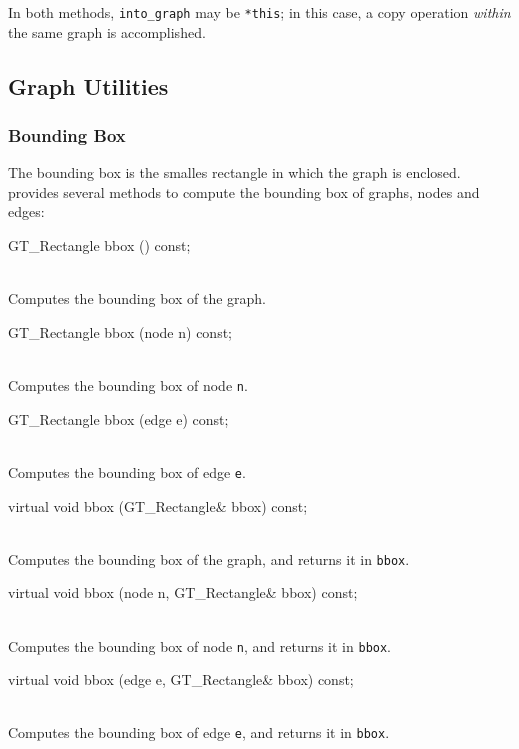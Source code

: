 \documentclass[twoside,fleqn]{report}
\begin{document}
\noindent In both methods, \texttt{into\_graph} may be \texttt{*this};
in this case, a copy operation \emph{within} the same graph is
accomplished.


%
%

\subsection{Graph Utilities}

\subsubsection{Bounding Box}

The bounding box is the smalles rectangle in which the graph is
enclosed.  provides several methods to compute the
bounding box of graphs, nodes and edges:

\begin{Cdefinition}

  \item[GT\_Rectangle bbox () const;] \strut\\
  Computes the bounding box of the graph.

  \item[GT\_Rectangle bbox (node n) const;]\ \strut\\
  Computes the bounding box of node \texttt{n}.

  \item[GT\_Rectangle bbox (edge e) const;] \strut\\
  Computes the bounding box of edge \texttt{e}.

  \item[virtual void bbox (GT\_Rectangle\& bbox) const;] \strut\\
  Computes the bounding box of the graph, and returns it in \texttt{bbox}.  

  \item[virtual void bbox (node n, GT\_Rectangle\& bbox) const;] \strut\\
  Computes the bounding box of node \texttt{n}, and returns it in
  \texttt{bbox}.

  \item[virtual void bbox (edge e, GT\_Rectangle\& bbox) const;] \strut\\
  Computes the bounding box of edge \texttt{e}, and returns it in
  \texttt{bbox}.

\end{Cdefinition}


%
%
\end{document}
